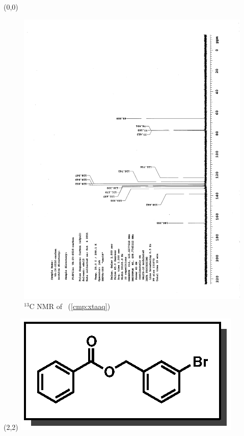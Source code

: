 \clearpage
\begin{textblock}{20}(0,0)
\begin{figure}[htb]
\caption{$^{13}$C NMR of  \CMPxtaaq\ (\ref{cmp:xtaaq})}
\includegraphics[scale=0.75, trim = 0mm 0mm 0mm 5mm,
clip]{chp_asymmetric/images/nmr/xtaaqC}
\vspace{-100pt}
\end{figure}
\end{textblock}
\begin{textblock}{1}(2,2)
\includegraphics[scale=0.8, angle=90]{chp_asymmetric/images/xtaaq}
\end{textblock}
\clearpage


